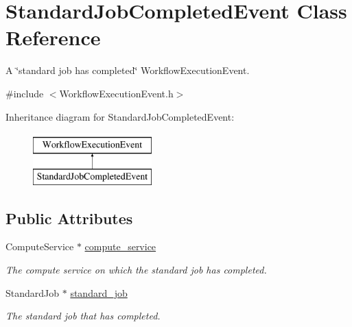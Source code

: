 \hypertarget{class_standard_job_completed_event}{}\section{Standard\+Job\+Completed\+Event Class Reference}
\label{class_standard_job_completed_event}


A \char`\"{}standard job has completed\char`\"{} Workflow\+Execution\+Event.  




{\ttfamily \#include $<$Workflow\+Execution\+Event.\+h$>$}

Inheritance diagram for Standard\+Job\+Completed\+Event\+:\begin{figure}[H]
\begin{center}
\leavevmode
\includegraphics[height=2.000000cm]{class_standard_job_completed_event}
\end{center}
\end{figure}
\subsection*{Public Attributes}
\begin{DoxyCompactItemize}
\item 
\mbox{\label{class_standard_job_completed_event_adcf390aba7745e228fc37b5cbdd0d292}} 
Compute\+Service $\ast$ \hyperlink{class_standard_job_completed_event_adcf390aba7745e228fc37b5cbdd0d292}{compute\+\_\+service}
\begin{DoxyCompactList}\small\item\em The compute service on which the standard job has completed. \end{DoxyCompactList}\item 
\mbox{\label{class_standard_job_completed_event_aa9442fe58f6205f2f1df75b390d40b6b}} 
Standard\+Job $\ast$ \hyperlink{class_standard_job_completed_event_aa9442fe58f6205f2f1df75b390d40b6b}{standard\+\_\+job}
\begin{DoxyCompactList}\small\item\em The standard job that has completed. \end{DoxyCompactList}\end{DoxyCompactItemize}


